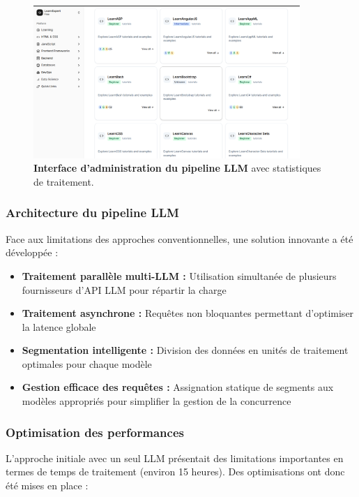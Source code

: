 \begin{figure}[h!]
  \centering
  \includegraphics[width=0.9\textwidth,keepaspectratio]{week_3_img/Screenshot 2025-05-20 164411.png}
  \caption{\textbf{Interface d'administration du pipeline LLM} avec statistiques de traitement.}
  \label{fig:llm_pipeline}
\end{figure}

\subsubsection{Architecture du pipeline LLM}

Face aux limitations des approches conventionnelles, une solution innovante a été développée :

\begin{itemize}
  \item \textbf{Traitement parallèle multi-LLM :} Utilisation simultanée de plusieurs fournisseurs d'API LLM pour répartir la charge
  \item \textbf{Traitement asynchrone :} Requêtes non bloquantes permettant d'optimiser la latence globale
  \item \textbf{Segmentation intelligente :} Division des données en unités de traitement optimales pour chaque modèle
  \item \textbf{Gestion efficace des requêtes :} Assignation statique de segments aux modèles appropriés pour simplifier la gestion de la concurrence
\end{itemize}

\subsubsection{Optimisation des performances}

L'approche initiale avec un seul LLM présentait des limitations importantes en termes de temps de traitement (environ 15 heures). Des optimisations ont donc été mises en place :

